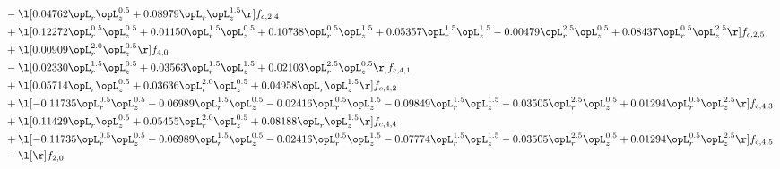 \begin{alignat}{2}
& - \l[  0.04762 \opL_r \opL_z^{0.5} +  0.08979 \opL_r \opL_z^{1.5}  \r] f_{c,2,4} \nonumber \\ 
& + \l[  0.12272 \opL_r^{0.5} \opL_z^{0.5} +  0.01150 \opL_r^{1.5} \opL_z^{0.5} +  0.10738 \opL_r^{0.5} \opL_z^{1.5} +  0.05357 \opL_r^{1.5} \opL_z^{1.5}   -0.00479 \opL_r^{2.5} \opL_z^{0.5} +  0.08437 \opL_r^{0.5} \opL_z^{2.5}  \r] f_{c,2,5} \nonumber \\ 
& + \l[  0.00909 \opL_r^{2.0} \opL_z^{0.5}  \r] f_{4,0} \nonumber \\ 
& - \l[  0.02330 \opL_r^{1.5} \opL_z^{0.5} +  0.03563 \opL_r^{1.5} \opL_z^{1.5} +  0.02103 \opL_r^{2.5} \opL_z^{0.5}  \r] f_{c,4,1} \nonumber \\ 
& + \l[  0.05714 \opL_r \opL_z^{0.5} +  0.03636 \opL_r^{2.0} \opL_z^{0.5} +  0.04958 \opL_r \opL_z^{1.5}  \r] f_{c,4,2} \nonumber \\ 
& + \l[  -0.11735 \opL_r^{0.5} \opL_z^{0.5}   -0.06989 \opL_r^{1.5} \opL_z^{0.5}   -0.02416 \opL_r^{0.5} \opL_z^{1.5}   -0.09849 \opL_r^{1.5} \opL_z^{1.5}   -0.03505 \opL_r^{2.5} \opL_z^{0.5} +  0.01294 \opL_r^{0.5} \opL_z^{2.5}  \r] f_{c,4,3} \nonumber \\ 
& + \l[  0.11429 \opL_r \opL_z^{0.5} +  0.05455 \opL_r^{2.0} \opL_z^{0.5} +  0.08188 \opL_r \opL_z^{1.5}  \r] f_{c,4,4} \nonumber \\ 
& + \l[  -0.11735 \opL_r^{0.5} \opL_z^{0.5}   -0.06989 \opL_r^{1.5} \opL_z^{0.5}   -0.02416 \opL_r^{0.5} \opL_z^{1.5}   -0.07774 \opL_r^{1.5} \opL_z^{1.5}   -0.03505 \opL_r^{2.5} \opL_z^{0.5} +  0.01294 \opL_r^{0.5} \opL_z^{2.5}  \r] f_{c,4,5} \nonumber \\ 
& - \l[  \r] f_{2,0} \nonumber \\ 
\end{alignat} 



